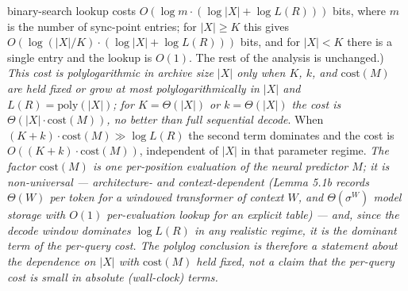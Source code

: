 \documentclass[
]{article}
\begin{document}
{binary-search lookup costs
$O(\log m \cdot (\log |X| + \log L(R)))$ bits, where $m$ is the
number of sync-point entries; for $|X| \geq K$ this gives
$O(\log(|X|/K) \cdot (\log |X| + \log L(R)))$ bits, and for
$|X| < K$ there is a single entry and the lookup is $O(1)$. The
rest of the analysis is unchanged.) \emph{This cost is polylogarithmic in archive size
$|X|$ only when $K$, $k$, and $\mathrm{cost}(M)$ are held fixed or
grow at most polylogarithmically in $|X|$ and
$L(R) = \mathrm{poly}(|X|)$; for
$K = \Theta(|X|)$ or $k = \Theta(|X|)$ the cost is
$\Theta(|X| \cdot \mathrm{cost}(M))$, no better than full sequential
decode}. When $(K+k) \cdot
\mathrm{cost}(M) \gg \log L(R)$ the second term dominates and the
cost is $O((K+k) \cdot \mathrm{cost}(M))$, independent of $|X|$ in
that parameter regime. \emph{The factor $\mathrm{cost}(M)$ is one
per-position evaluation of the neural predictor $M$; it is
non-universal --- architecture- and context-dependent (Lemma 5.1b
records $\Theta(W)$ per token for a windowed transformer of context
$W$, and $\Theta(\sigma^W)$ model storage with $O(1)$ per-evaluation
lookup for an explicit table) --- and, since the decode window
dominates $\log L(R)$ in any realistic regime, it is the dominant
term of the per-query cost. The polylog conclusion is therefore a
statement about the dependence on $|X|$ with $\mathrm{cost}(M)$ held
fixed, not a claim that the per-query cost is small in absolute
(wall-clock) terms.}}
\end{document}
